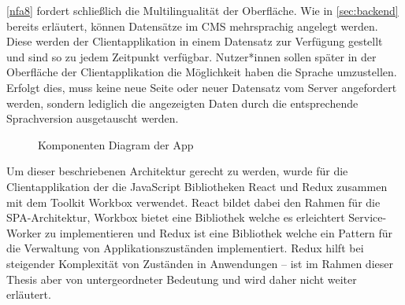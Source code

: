 \ref{nfa8} fordert schließlich die Multilingualität der Oberfläche. Wie in \autoref{sec:backend} 
bereits erläutert, können Datensätze im CMS mehrsprachig angelegt werden. Diese werden der Clientapplikation
in einem Datensatz zur Verfügung gestellt und sind so zu jedem Zeitpunkt verfügbar. 
Nutzer*innen sollen später in der Oberfläche der Clientapplikation die Möglichkeit haben die Sprache
umzustellen. Erfolgt dies, muss keine neue Seite oder neuer Datensatz vom Server angefordert werden, sondern lediglich
die angezeigten Daten durch die entsprechende Sprachversion ausgetauscht werden.\\

\begin{figure}
    \centering
    
    \caption{Komponenten Diagram der \shst{} App}
    \label{fig:ss-app-class-diagram}
\end{figure}

Um dieser beschriebenen Architektur gerecht zu werden, wurde für die Clientapplikation der \shst{} die JavaScript
Bibliotheken React \cite{react} und Redux \cite{redux} zusammen mit dem 
Toolkit Workbox \cite{workbox} verwendet. React bildet dabei
den Rahmen für die SPA-Architektur, Workbox bietet eine Bibliothek welche es erleichtert 
Service-Worker zu implementieren und Redux ist eine Bibliothek welche ein Pattern für die Verwaltung 
von Applikationszuständen implementiert. Redux hilft bei steigender Komplexität von 
Zuständen in Anwendungen -- ist im Rahmen dieser Thesis aber von untergeordneter Bedeutung und wird daher
nicht weiter erläutert.\\

